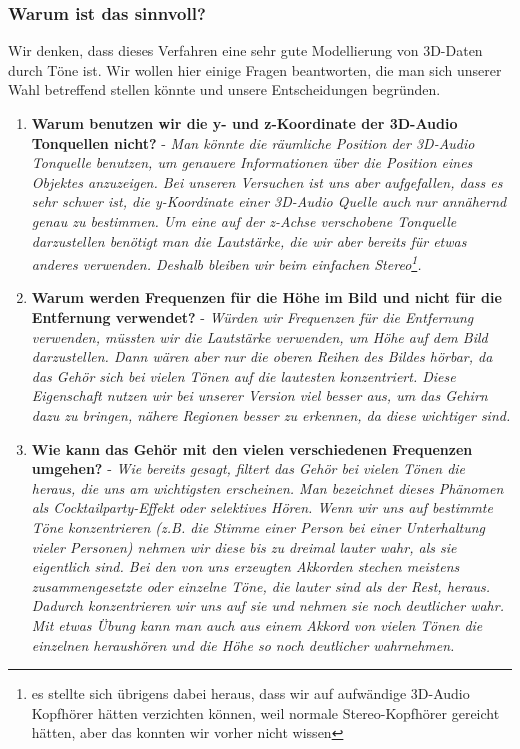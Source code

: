 \documentclass[a4paper,12pt,ngerman]{scrartcl}
\begin{document}
\subsubsection{Warum ist das sinnvoll?}

Wir denken, dass dieses Verfahren eine sehr gute Modellierung von 3D-Daten durch Töne ist. Wir wollen hier einige 
Fragen beantworten, die man sich unserer Wahl betreffend stellen könnte und unsere Entscheidungen begründen.
\begin{enumerate}
	\item \textbf{Warum benutzen wir die y- und z-Koordinate der 3D-Audio Tonquellen nicht?} - \textit{Man könnte die
	räumliche Position der 3D-Audio Tonquelle benutzen, um genauere Informationen über die Position eines
	Objektes anzuzeigen. Bei unseren Versuchen ist uns aber aufgefallen, dass es sehr schwer ist, die y-Koordinate einer 3D-Audio Quelle auch nur annähernd genau zu bestimmen. Um eine auf der z-Achse verschobene Tonquelle 
	darzustellen benötigt man die Lautstärke, die wir aber bereits für etwas anderes verwenden. Deshalb
	bleiben wir beim einfachen Stereo\footnote{es stellte sich übrigens dabei heraus, dass wir auf aufwändige
	3D-Audio Kopfhörer hätten verzichten können, weil normale Stereo-Kopfhörer gereicht hätten, aber das konnten wir vorher nicht wissen}.}
	\item \textbf{Warum werden Frequenzen für die Höhe im Bild und nicht für die Entfernung verwendet?} - \textit{Würden wir Frequenzen für die Entfernung verwenden, müssten wir die Lautstärke verwenden, um Höhe auf dem Bild darzustellen. Dann wären aber nur die oberen Reihen des Bildes 
	hörbar, da das Gehör sich bei vielen Tönen auf die lautesten konzentriert. Diese Eigenschaft nutzen wir bei 
	unserer Version viel besser aus, 
	um das Gehirn dazu zu bringen, nähere Regionen besser zu erkennen, da diese wichtiger sind.}
	\item \textbf{Wie kann das Gehör mit den vielen verschiedenen Frequenzen umgehen?} - \textit{Wie bereits gesagt, filtert das 
	Gehör bei vielen Tönen die heraus, die uns am wichtigsten erscheinen. Man bezeichnet dieses Phänomen als Cocktailparty-Effekt 
	oder selektives Hören. Wenn wir uns auf bestimmte Töne konzentrieren (z.B. die Stimme einer Person bei einer Unterhaltung vieler
	Personen) nehmen wir diese bis zu dreimal lauter wahr, als sie eigentlich sind. Bei den von uns erzeugten Akkorden stechen meistens
	zusammengesetzte oder einzelne Töne, die lauter sind als der Rest, heraus. Dadurch konzentrieren wir uns auf sie und nehmen sie noch deutlicher wahr. Mit etwas Übung kann man auch aus einem Akkord von vielen Tönen 
	die einzelnen heraushören und die Höhe so noch deutlicher wahrnehmen.}
\end{enumerate}
\end{document}
